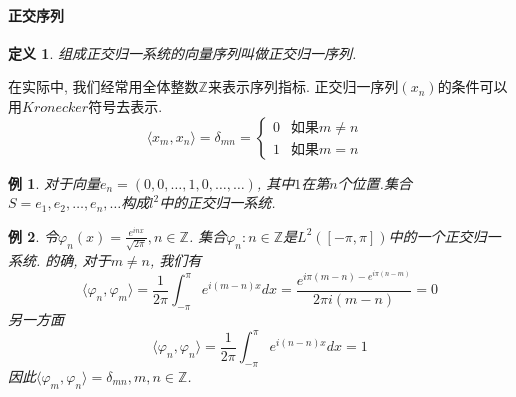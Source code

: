\documentclass[a4paper,11pt]{article}
\newtheorem{definition}{\hspace{2em}定义}[section]
\newtheorem{example}{例}[section]
\begin{document}
\paragraph*{正交序列}
\begin{definition}
  组成正交归一系统的向量序列叫做正交归一序列.
\end{definition}
在实际中, 我们经常用全体整数$\mathbb{Z}$来表示序列指标. 正交归一序列$(x_n)$的条件可以用$Kronecker$符号去表示.
\begin{equation*}
  \langle x_m,x_n\rangle=\delta_{mn}=\begin{cases}
                                       0 & \text{如果$m\neq n$ }\\
                                       1 & \text{如果$m=n$}
                                     \end{cases}
\end{equation*}
\begin{example}
  对于向量$e_n=(0,0,\dots,1,0,\dots,\dots)$, 其中$1$在第$n$个位置.集合$S={e_1,e_2,\dots,e_n,\dots}$构成$l^2$中的正交归一系统.
\end{example}
\begin{example}
  令$\varphi_n(x)=\frac{e^{inx}}{\sqrt{2\pi}},n\in \mathbb{Z}$. 集合${\varphi_n:n\in\mathbb{Z}}$是$L^2([-\pi,\pi])$中的一个正交归一系统. 的确, 对于$m\neq n$, 我们有
  \begin{equation*}
    \langle\varphi_n,\varphi_m\rangle=\frac{1}{2\pi}\int_{-\pi}^{\pi}e^{i(m-n)x}dx=\frac{e^{i\pi(m-n)-e^{i\pi(n-m)}}}{2\pi i(m-n)}=0
  \end{equation*}
  另一方面
  \begin{equation*}
    \langle\varphi_n,\varphi_n\rangle=\frac{1}{2\pi}\int_{-\pi}^{\pi}e^{i(n-n)x}dx=1
  \end{equation*}
  因此$\langle\varphi_m,\varphi_n\rangle=\delta_{mn},m,n\in\mathbb{Z}$.
\end{example}
\end{document}
